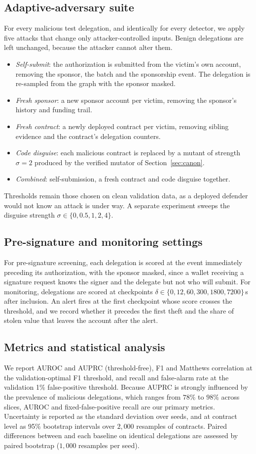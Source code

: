 \subsection{Adaptive-adversary suite}
For every malicious test delegation, and identically for every detector, we apply five attacks that change only attacker-controlled inputs. Benign delegations are left unchanged, because the attacker cannot alter them.
\begin{itemize}
\item \emph{Self-submit}: the authorization is submitted from the victim's own account, removing the sponsor, the batch and the sponsorship event. The delegation is re-sampled from the graph with the sponsor masked.
\item \emph{Fresh sponsor}: a new sponsor account per victim, removing the sponsor's history and funding trail.
\item \emph{Fresh contract}: a newly deployed contract per victim, removing sibling evidence and the contract's delegation counters.
\item \emph{Code disguise}: each malicious contract is replaced by a mutant of strength $\sigma=2$ produced by the verified mutator of Section~\ref{sec:canon}.
\item \emph{Combined}: self-submission, a fresh contract and code disguise together.
\end{itemize}
Thresholds remain those chosen on clean validation data, as a deployed defender would not know an attack is under way. A separate experiment sweeps the disguise strength $\sigma\in\{0,0.5,1,2,4\}$.

\subsection{Pre-signature and monitoring settings}
For pre-signature screening, each delegation is scored at the event immediately preceding its authorization, with the sponsor masked, since a wallet receiving a signature request knows the signer and the delegate but not who will submit. For monitoring, delegations are scored at checkpoints $\delta\in\{0,12,60,300,1800,7200\}$\,s after inclusion. An alert fires at the first checkpoint whose score crosses the threshold, and we record whether it precedes the first theft and the share of stolen value that leaves the account after the alert.

\subsection{Metrics and statistical analysis}
We report AUROC and AUPRC (threshold-free), F1 and Matthews correlation at the validation-optimal F1 threshold, and recall and false-alarm rate at the validation 1\% false-positive threshold. Because AUPRC is strongly influenced by the prevalence of malicious delegations, which ranges from $78\%$ to $98\%$ across slices, AUROC and fixed-false-positive recall are our primary metrics. Uncertainty is reported as the standard deviation over seeds, and at contract level as 95\% bootstrap intervals over $2{,}000$ resamples of contracts. Paired differences between \dn{} and each baseline on identical delegations are assessed by paired bootstrap ($1{,}000$ resamples per seed).

